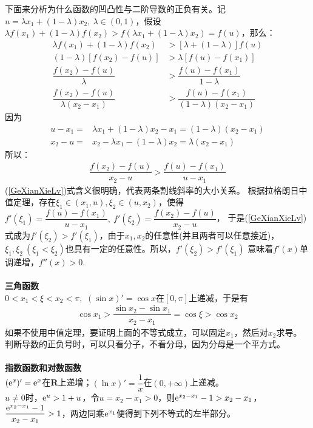 \begin{itemize}[leftmargin=\inteval{\myitemleftmargin}pt,itemsep=
   \inteval{\myitemitempsep}pt,topsep=\inteval{\myitemtopsep}pt]
下面来分析为什么函数的凹凸性与二阶导数的正负有关。记
$ u=\lambda x_1+(1-\lambda)x_2,\ \lambda\in(0,1) $，假设$ \lambda f(x_1)+
(1-\lambda)f(x_2) >f(\lambda x_1+(1-\lambda)x_2)=f(u) $，那么：
\begin{align*}
    \lambda f(x_1)+(1-\lambda)f(x_2) & >\left[ \lambda +(1-\lambda) \right]  f(u) \\
    (1-\lambda)\left[ f(x_2)-f(u)\right] &>\lambda \left[f(u)- f(x_1) \right]   \\
    \dfrac{f(x_2)-f(u)}{ \lambda } &> \dfrac{f(u) - f(x_1)}{1-\lambda}  \\
    \dfrac{f(x_2)-f(u)}{ \lambda (x_2-x_1)} &> \dfrac{f(u) - f(x_1)}{(1-\lambda)(x_2-x_1)} 
\end{align*}
因为
\begin{align*}
    u-x_1 =&\lambda x_1+(1-\lambda)x_2-x_1=(1- \lambda)(x_2-x_1) \\
    x_2-u =&x_2-\lambda x_1-(1-\lambda)x_2=\lambda (x_2-x_1) 
\end{align*}
所以：
\begin{align}\label{GeXianXieLv}
    \dfrac{f(x_2)-f(u)}{ x_2-u} > \dfrac{f(u) - f(x_1)}{u-x_1} 
\end{align}
(\ref{GeXianXieLv})式含义很明确，代表两条割线斜率的大小关系。
根据拉格朗日中值定理，存在$ \xi_1 \in (x_1,u),\xi_2 \in (u,x_2) $，使得
$ f'(\xi_1)=\dfrac{f(u) - f(x_1)}{u-x_1}, \ f'(\xi_2)=\dfrac{f(x_2)-f(u)}{ x_2-u} $，
于是(\ref{GeXianXieLv})式成为$ f'(\xi_2) > f'(\xi_1) $，由于$ x_1,x_2 $的任意性(并且两者可以任意接近)，
$ \xi_1,\xi_2\ (\xi_1<\xi_2) $也具有一定的任意性。所以，$ f'(\xi_2) > f'(\xi_1) $
意味着$ f'(x) $单调递增，$ f''(x) > 0 $. \\
\\
\textbf{三角函数} \\
$ 0<x_1<\xi<x_2<\pi$,\ $ (\sin x)'=\cos x $在$ [0,\pi] $上递减，于是有
\begin{align*}
    \cos x_1>\dfrac{\sin x_2 - \sin x_1}{x_2 -x_1}=\cos \xi>\cos x_2 
\end{align*}
如果不使用中值定理，要证明上面的不等式成立，可以固定$ x_1 $，然后对$ x_2 $求导。
判断导数的正负号时，可以只看分子，不看分母，因为分母是一个平方式。\\
\\
\textbf{指数函数和对数函数} \\
$ (\mathrm{e}^x)'=\mathrm{e}^x $在\textbf{R}上递增；$ (\ln x)'=\dfrac{1}{x} $在$ (0,+\infty) $上递减。\\
$ u\neq 0 $时，$ \mathrm{e}^u>1+u $，令$ u=x_2-x_1>0 $，则$ \mathrm{e}^{x_2-x_1}-1>x_2-x_1 $，
$ \dfrac{\mathrm{e}^{x_2-x_1}-1}{x_2-x_1}>1 $，两边同乘$ \mathrm{e}^{x_1} $便得到下列不等式的左半部分。

\end{itemize}

